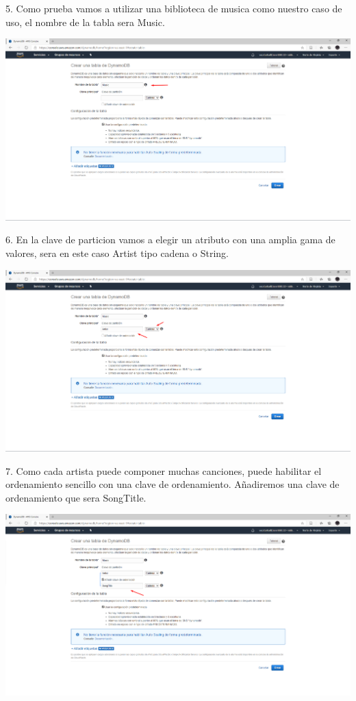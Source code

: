 \documentclass[12pt,letterpaper]{article}
\begin{document}
5.	Como prueba vamos a utilizar una biblioteca de musica como nuestro caso de uso, el nombre de la tabla sera Music.
\begin{center}
    \includegraphics[width=15cm]{img/5.png}  
\end{center}





6.	En la clave de particion vamos a elegir un atributo con una amplia gama de valores, sera en este caso Artist tipo cadena o String.
\begin{center}
    \includegraphics[width=15cm]{img/6.png}  
\end{center}
\newpage




7.	Como cada artista puede componer muchas canciones, puede habilitar el ordenamiento sencillo con una clave de ordenamiento. Añadiremos una clave de ordenamiento que sera SongTitle.
\begin{center}
    \includegraphics[width=15cm]{img/7.png}  
\end{center}
\end{document}
